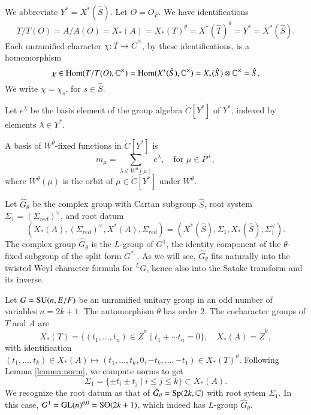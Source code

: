 We abbreviate $Y^* = X^*(\hat S)$. Let $O=O_F$.
We have identifications
\begin{equation}\label{eqn:identify}
T/T(O)=A/A(O)=X_*(A)=X_*(T)^\theta  =X^*(\hat T)^\theta = Y^* = X^*(\hat S).
\end{equation}
Each unramified character $\chi:T\to \ring{C}^\times$, by these identifications, is a homomorphism
\begin{equation}
\chi\in{\operatorname{Hom}}(T/T(O),\mathbb{C}^\times) = {\operatorname{Hom}}(X^*(\hat S),\mathbb{C}^\times) = X_*(\hat S)\otimes \mathbb{C}^\times = \hat S.
\end{equation}
We write $\chi = \chi_s$, for $s\in\hat S$.

Let $e^\lambda$ be the basis element of  the group algebra $\ring{C}[Y^*]$ of $Y^*$, 
 indexed by  elements $\lambda\in Y^*$.

A basis of $W^\theta$-fixed functions in $\ring{C}[Y^*]$ is 
\[
m_\mu = \sum_{\lambda\in W^\theta(\mu)} e^\lambda, \quad \text{for }\mu\in P^+,
\]
where $W^\theta(\mu)$ is the orbit of $\mu\in\ring{C}[Y^*]$ under $W^\theta$.




Let $\hat G_\theta$ be the complex group with
 Cartan subgroup $\hat S$, root system 
$\Sigma_1=(\Sigma_{red})^\vee$, and root datum
\[
(X_*(A),(\Sigma_{red})^\vee,X^*(A),\Sigma_{red}) = (X^*(\hat S),\Sigma_1,X_*(\hat S),\Sigma_1^\vee).
\]
The complex group $\hat G_\theta$ is the $L$-group of $G^1$, the identity component of the
$\theta$-fixed subgroup of the split form $G^*$ \cite[\S1.3]{kottwitz1999foundations}.
As we will see, $\hat G_\theta$ fits naturally
into the twisted Weyl character formula for  ${}^LG$, hence also into the Satake transform
and its inverse.  

\begin{example}  Let $G={\operatorname{SU}}(n,E/F)$ be an unramified unitary group in an odd number of variables $n=2k+1$.
The automorphism $\theta$ has order $2$.
The cocharacter groups of $T$ and $A$ are
\[
X_*(T) = \{(t_1,\ldots,t_{n})\in \ring{Z}^n\mid t_1+\cdots t_n=0\}, 
\quad
X_*(A)  = \ring{Z}^k,
\]
with identification $(t_1,\ldots,t_k)\in X_*(A)\mapsto (t_1,\ldots,t_k,0,-t_k,\ldots,-t_1)\in X_*(T)^\theta$.
Following Lemma \ref{lemma:norm}, we compute norms to get
\[
\Sigma_1 = \{\pm t_i\pm t_j\mid i\le j\le k\}\subset X_*(A).
\]
We recognize the root datum as that of $\hat G_\theta = {\operatorname{Sp}}(2k,\mathbb{C})$ with root sytem $\Sigma_1$.  
In this case, $G^1 = {\operatorname{GL}}(n)^{\theta,0} = {\operatorname{SO}}(2k+1)$, which indeed has $L$-group $\hat G_\theta$.
\end{example}






